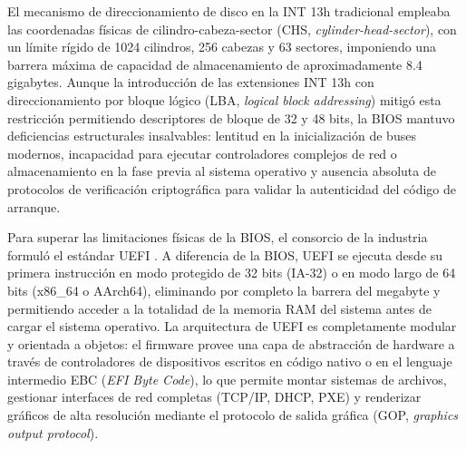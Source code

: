 \documentclass[12pt]{article}
\begin{document}
El mecanismo de direccionamiento de disco en la INT 13h tradicional empleaba las coordenadas físicas de cilindro-cabeza-sector (CHS, \textit{cylinder-head-sector}), con un límite rígido de 1024 cilindros, 256 cabezas y 63 sectores, imponiendo una barrera máxima de capacidad de almacenamiento de aproximadamente 8.4 gigabytes. Aunque la introducción de las extensiones INT 13h con direccionamiento por bloque lógico (LBA, \textit{logical block addressing}) mitigó esta restricción permitiendo descriptores de bloque de 32 y 48 bits, la BIOS mantuvo deficiencias estructurales insalvables: lentitud en la inicialización de buses modernos, incapacidad para ejecutar controladores complejos de red o almacenamiento en la fase previa al sistema operativo y ausencia absoluta de protocolos de verificación criptográfica para validar la autenticidad del código de arranque.

Para superar las limitaciones físicas de la BIOS, el consorcio de la industria formuló el estándar UEFI \parencite{uefi2024specification}. A diferencia de la BIOS, UEFI se ejecuta desde su primera instrucción en modo protegido de 32 bits (IA-32) o en modo largo de 64 bits (x86\_64 o AArch64), eliminando por completo la barrera del megabyte y permitiendo acceder a la totalidad de la memoria RAM del sistema antes de cargar el sistema operativo. La arquitectura de UEFI es completamente modular y orientada a objetos: el firmware provee una capa de abstracción de hardware a través de controladores de dispositivos escritos en código nativo o en el lenguaje intermedio EBC (\textit{EFI Byte Code}), lo que permite montar sistemas de archivos, gestionar interfaces de red completas (TCP/IP, DHCP, PXE) y renderizar gráficos de alta resolución mediante el protocolo de salida gráfica (GOP, \textit{graphics output protocol}).
\end{document}
